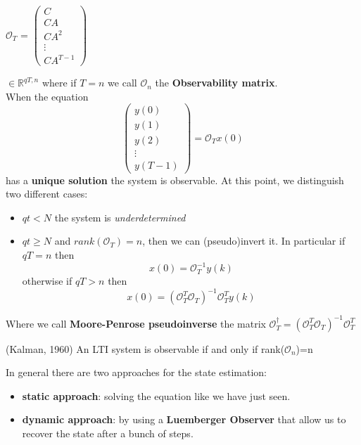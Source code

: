 $\mathcal{O}_T$ = 
$\begin{pmatrix}
    C\\ CA \\ CA^2 \\ \vdots \\ CA^{T-1} 
\end{pmatrix}$ 

$\in\mathbb{R}^{qT, n}$ where if $T=n$ we call 
$ \mathcal{O}_n$ 
the \textbf{Observability matrix}.\\
\noindent
When the equation 
\begin{equation*}
    \begin{pmatrix} y(0)\\ y(1)\\ y(2)\\   \vdots\\    y(T-1) \end{pmatrix}= \mathcal{O}_T  x(0) 
\end{equation*}
has a \textbf{unique solution} the system is observable.
At this point, we distinguish two different cases: 
\begin{itemize}
    \setlength\itemsep{0em}
    \item $qt<N$ the system is \textit{underdetermined}
    \item $qt\geq N$ and $rank(\mathcal{O}_T)=n$, then we can (pseudo)invert it. In particular if  $qT=n$ then $$x(0)=\mathcal{O}_T^{-1}y(k)$$ otherwise if $qT>n$ then $$x(0)=(\mathcal{O}_T^T\mathcal{O}_T)^{-1}\mathcal{O}_T^Ty(k)$$
\end{itemize}
Where we call \textbf{Moore-Penrose pseudoinverse} the matrix 
    $\mathcal{O}_T^{\dagger}=(\mathcal{O}_T^T\mathcal{O}_T)^{-1}\mathcal{O}_T^T$

\begin{theorem}{(Kalman, 1960)}
    An LTI system is observable if and only if rank($\mathcal{O}_n$)=n
\end{theorem}
In general there are two approaches for the state estimation: 
\begin{itemize}
    \setlength\itemsep{0em}
    \item \textbf{static approach}: solving the equation like we have just seen.
    \item \textbf{dynamic approach}: by using a \textbf{Luemberger Observer} that allow us to recover the state after a bunch of steps. 
\end{itemize}

